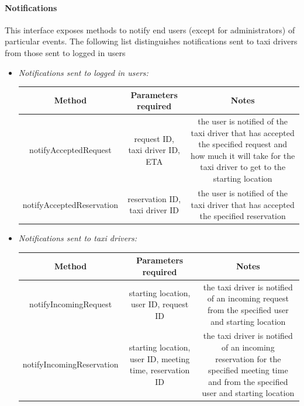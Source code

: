 \documentclass{article}
\begin{document}
\begin{itemize}
\paragraph{Notifications}
This interface exposes methods to notify end users (except for administrators) of particular events. 
The following list distinguishes notifications sent to taxi drivers from those sent to logged in users
\begin{itemize}
	\item \textit{Notifications sent to logged in users:} \\
		\begin{adjustbox}{width=1.2\textwidth}	
			\begin{tabular}{*{3}{c}}
				\toprule
				Method & Parameters required & Notes \\
				\midrule
				notifyAcceptedRequest & request ID, taxi driver ID, ETA & the user is notified of the taxi driver that has accepted the specified request and how much it will take for the taxi driver to get to the starting location\\ 
				notifyAcceptedReservation & reservation ID, taxi driver ID & the user is notified of the taxi driver that has accepted the specified reservation \\
				\bottomrule
			\end{tabular}
		\end{adjustbox}	
	\item \textit{Notifications sent to taxi drivers:} \\
		\begin{adjustbox}{width=1.2\textwidth}	
			\begin{tabular}{*{3}{c}}
				\toprule
				Method & Parameters required & Notes \\
				\midrule
				notifyIncomingRequest & starting location, user ID, request ID & the taxi driver is notified of an incoming request from the specified user and starting location\\ 
				notifyIncomingReservation & starting location, user ID, meeting time, reservation ID & the taxi driver is notified of an incoming reservation for the specified meeting time and from the specified user and starting location \\
				\bottomrule
			\end{tabular}
		\end{adjustbox}	
\end{itemize}		
\end{itemize}
\end{document}
